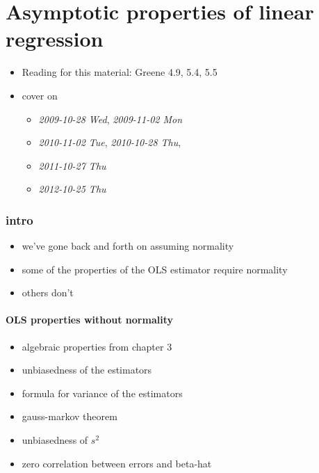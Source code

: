 
\part*{Asymptotic properties of linear regression}%

\begin{itemize}
\item Reading for this material: Greene 4.9, 5.4, 5.5
\item cover on
\begin{itemize}
\item \textit{2009-10-28 Wed}, \textit{2009-11-02 Mon}
\item \textit{2010-11-02 Tue}, \textit{2010-10-28 Thu},
\item \textit{2011-10-27 Thu}
\item \textit{2012-10-25 Thu}
\end{itemize}
\end{itemize}
\section{intro}
\label{sec-1}

\begin{itemize}
\item we've gone back and forth on assuming normality
\item some of the properties of the OLS estimator require normality
\item others don't
\end{itemize}
\subsection{OLS properties without normality}
\label{sec-1-1}

\begin{itemize}
\item algebraic properties from chapter 3
\item unbiasedness of the estimators
\item formula for variance of the estimators
\item gauss-markov theorem
\item unbiasedness of $s^2$
\item zero correlation between errors and beta-hat
\end{itemize}
